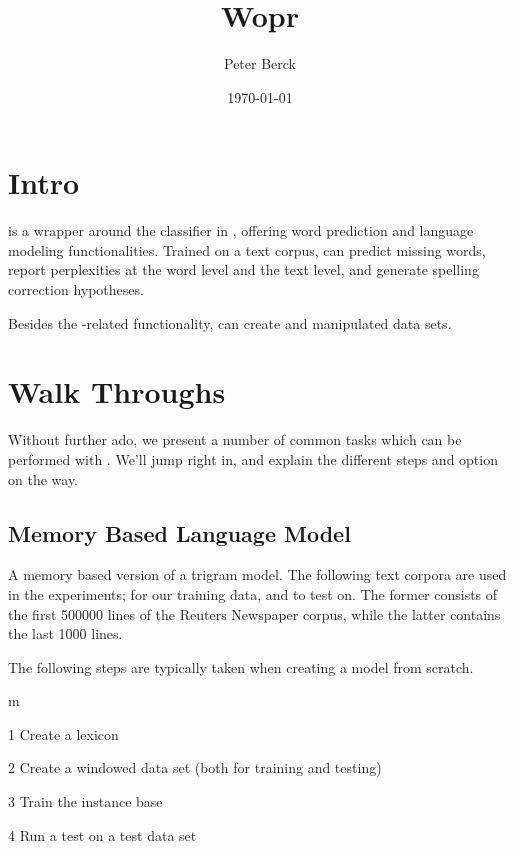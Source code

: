 \documentclass[a4paper,10pt,twoside]{report}
\begin{document}
\title{Wopr}
\author{Peter Berck}
\date{\today}

\maketitle

\clearpage
\tableofcontents


\chapter{Intro}

\Wopr{} is a wrapper around the \knn{} classifier in \Timbl{},
offering word prediction and language modeling
functionalities. Trained on a text corpus, \wopr{} can predict missing
words, report perplexities at the word level and the text level, and
generate spelling correction hypotheses.

\par
Besides the \Timbl{}-related functionality, \wopr{} can create and
manipulated data sets.

\chapter{Walk Throughs}

Without further ado, we present a number of common tasks which can be
performed with \wopr{}. We'll jump right in, and explain the different
steps and option on the way.

\section{Memory Based Language Model}

A memory based version of a trigram model. The following text corpora
are used in the experiments;  for our training data, and
 to test on. The former consists of the first
\num{500000} lines of the Reuters Newspaper corpus, while the latter
contains the last \num{1000} lines.

The following steps are typically taken when creating a model from
scratch.

\begin{varlist}{m}
\item[1] Create a lexicon
\item[2] Create a windowed data set (both for training and testing)
\item[3] Train the instance base
\item[4] Run a test on a test data set
\end{varlist}
\end{document}
